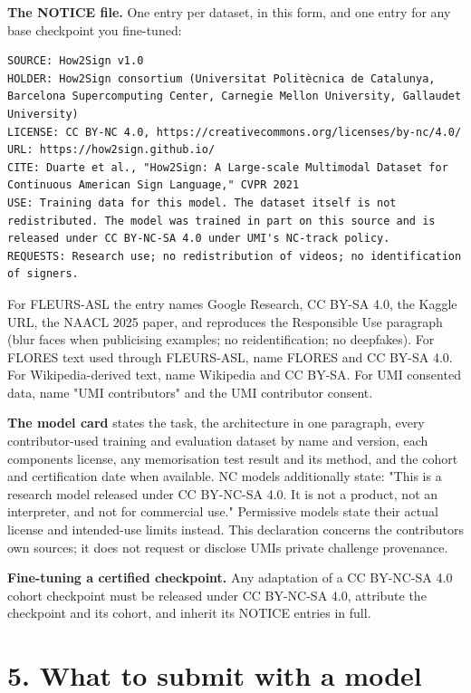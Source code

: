 \documentclass[10pt,a4paper]{article}
\begin{document}
\textbf{The NOTICE file.} One entry per dataset, in this form, and one
entry for any base checkpoint you fine-tuned:

\begin{verbatim}
SOURCE: How2Sign v1.0
HOLDER: How2Sign consortium (Universitat Politècnica de Catalunya, Barcelona Supercomputing Center, Carnegie Mellon University, Gallaudet University)
LICENSE: CC BY-NC 4.0, https://creativecommons.org/licenses/by-nc/4.0/
URL: https://how2sign.github.io/
CITE: Duarte et al., "How2Sign: A Large-scale Multimodal Dataset for Continuous American Sign Language," CVPR 2021
USE: Training data for this model. The dataset itself is not redistributed. The model was trained in part on this source and is released under CC BY-NC-SA 4.0 under UMI's NC-track policy.
REQUESTS: Research use; no redistribution of videos; no identification of signers.
\end{verbatim}

For FLEURS-ASL the entry names Google Research, CC BY-SA 4.0, the Kaggle
URL, the NAACL 2025 paper, and reproduces the Responsible Use paragraph
(blur faces when publicising examples; no reidentification; no
deepfakes). For FLORES text used through FLEURS-ASL, name FLORES and CC
BY-SA 4.0. For Wikipedia-derived text, name Wikipedia and CC BY-SA. For
UMI consented data, name "UMI contributors" and the UMI contributor
consent.

\textbf{The model card} states the task, the architecture in one
paragraph, every contributor-used training and evaluation dataset by
name and version, each component\textquotesingle s license, any
memorisation test result and its method, and the cohort and
certification date when available. NC models additionally state: "This
is a research model released under CC BY-NC-SA 4.0. It is not a product,
not an interpreter, and not for commercial use." Permissive models state
their actual license and intended-use limits instead. This declaration
concerns the contributor\textquotesingle s own sources; it does not
request or disclose UMI\textquotesingle s private challenge provenance.

\textbf{Fine-tuning a certified checkpoint.} Any adaptation of a CC
BY-NC-SA 4.0 cohort checkpoint must be released under CC BY-NC-SA 4.0,
attribute the checkpoint and its cohort, and inherit its NOTICE entries
in full.

\section{5. What to submit with a
model}\label{5-what-to-submit-with-a-model}
\end{document}
